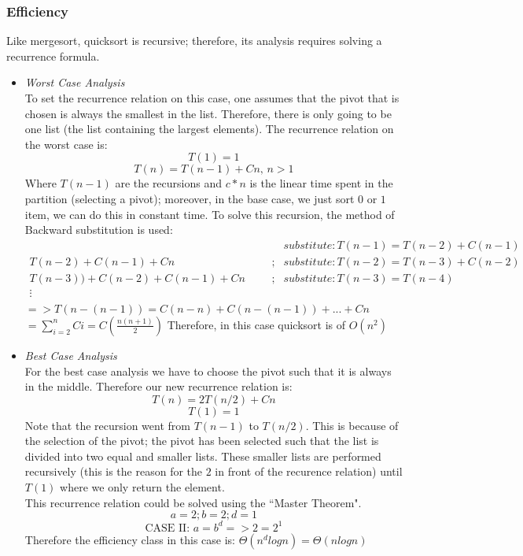 \documentclass{article}
\begin{document}
\subsubsection{Efficiency}
Like mergesort, quicksort is recursive; therefore, its analysis requires
solving a recurrence formula.\\
\begin{itemize}
\item\emph{Worst Case Analysis}\\
To set the recurrence relation on this case, one assumes that the pivot
that is chosen is always the smallest in the list. Therefore, there is 
only going to be one list (the list containing the largest elements).
The recurrence relation on the worst case is:
$$T(1) = 1$$
$$T(n) = T(n-1) + Cn\mbox{, } n > 1$$
Where $T(n-1)$ are the recursions and $c*n$ is the linear time spent in
the partition (selecting a pivot); moreover, in the base case, we just
sort $0$ or $1$ item, we can do this in constant time. To solve this
recursion, 
the method of Backward substitution is used:\\
$$\begin{array}{lclcl}
 &  & &  & substitute: T(n - 1) = T(n - 2) + C(n - 1)\\
T(n - 2) + C(n - 1) + Cn & & &;& substitute: T(n - 2) = T(n - 3) + C(n -
2)\\
T(n - 3)) + C(n - 2) + C(n - 1) + Cn & & &;& substitute: T(n - 3) = T(n
- 4) \\
\vdots & & & & \\
\end{array}$$
$=> T(n - (n - 1)) = C(n - n) + C(n-(n - 1)) + ... + Cn$\\
$= \displaystyle\sum_{i = 2}^{n}Ci = C\left(\frac{n(n + 1)}{2}\right)$
Therefore, in this case quicksort is of $O(n^2)$\\

\item\emph{Best Case Analysis}\\
For the best case analysis we have to choose the pivot such that it is
always in the middle. Therefore our new recurrence relation is:
$$T(n) = 2T(n/2) + Cn$$
$$T(1) = 1$$
Note that the recursion went from $T(n - 1)$ to $T(n/2)$. This is
because
of the selection of the pivot; the pivot has been selected such that the
list is divided into two equal and smaller lists. These smaller lists
are
performed recursively (this is the reason for the $2$ in front of the
recurence relation) until $T(1)$ where we only return the element.\\
This recurrence relation could be solved using the ``Master
Theorem"\cite{levitin}.\\
$$a = 2; b = 2; d = 1$$
$$\mbox{CASE II: } a = b^d  =>  2 = 2^1$$
Therefore the efficiency class in this case is: $\Theta(n^dlogn) =
\Theta(nlogn)$\\

\end{itemize}
\end{document}
